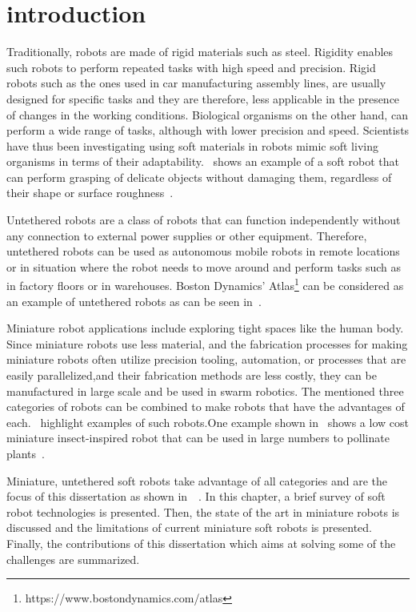 \graphicspath{{Images/intro/}}
\chapter{introduction}
\label{chap:intro}
Traditionally, robots are made of rigid materials such as steel. Rigidity enables such robots to perform repeated tasks with high speed and precision. Rigid robots such as the ones used in car manufacturing assembly lines, are usually designed for specific tasks and they are therefore, less applicable in the presence of changes in the working conditions. Biological organisms on the other hand, can perform a wide range of tasks, although with lower precision and speed. Scientists have thus been investigating using soft materials in robots mimic soft living organisms in terms of their adaptability.~ shows an example of a soft robot that can perform grasping of delicate objects without damaging them, regardless of their shape or surface roughness~\cite{Li2019}.

Untethered robots are a class of robots that can function independently without any connection to external power supplies or other equipment. Therefore, untethered robots can be used as autonomous mobile robots in remote locations or in situation where the robot needs to move around and perform tasks such as in factory floors or in warehouses. Boston Dynamics' Atlas\footnote{https://www.bostondynamics.com/atlas\label{fn:boston}} can be considered as an example of untethered robots as can be seen in~. 

Miniature robot applications include exploring tight spaces like the human body. Since miniature robots use less material, and the fabrication processes for making miniature robots often utilize precision tooling, automation, or processes that are easily parallelized,and their fabrication methods are less costly, they can be manufactured in large scale and be used in swarm robotics. The mentioned three categories of robots can be combined to make robots that have the advantages of each.~ highlight examples of such robots.One example shown in~ shows a low cost miniature insect-inspired robot that can be used in large numbers to pollinate plants~\cite{Jafferis2019}. 

Miniature, untethered soft robots take advantage of all categories and are the focus of this dissertation as shown in~~\cite{Khodambashi2021untethered}. In this chapter, a brief survey of soft robot technologies is presented. Then, the state of the art in miniature robots is discussed and the limitations of current miniature soft robots is presented. Finally, the contributions of this dissertation which aims at solving some of the challenges are summarized.
 
